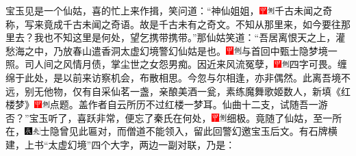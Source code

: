宝玉见是一个仙姑，喜的忙上来作揖，笑问道：``神仙姐姐，{\includegraphics[width=3mm]{../Images/00002}\includegraphics[width=3mm]{../Images/00011}\footnotesize \kaishu 千古未闻之奇称，写来竟成千古未闻之奇语。故是千古未有之奇文。}不知从那里来，如今要往那里去？我也不知这里是何处，望乞携带携带。''那仙姑笑道：``吾居离恨天之上，灌愁海之中，乃放春山遣香洞太虚幻境警幻仙姑是也。{\includegraphics[width=3mm]{../Images/00002}\includegraphics[width=3mm]{../Images/00011}\footnotesize \kaishu 与首回中甄士隐梦境一照。}司人间之风情月债，掌尘世之女怨男痴。因近来风流冤孽，{\includegraphics[width=3mm]{../Images/00002}\includegraphics[width=3mm]{../Images/00011}\footnotesize \kaishu 四字可畏。}缠绵于此处，是以前来访察机会，布散相思。今忽与尔相逢，亦非偶然。此离吾境不远，别无他物，仅有自采仙茗一盏，亲酿美酒一瓮，素练魔舞歌姬数人，新填《红楼梦》{\includegraphics[width=3mm]{../Images/00002}\includegraphics[width=3mm]{../Images/00011}\footnotesize \kaishu 点题。盖作者自云所历不过红楼一梦耳。}仙曲十二支，试随吾一游否？''宝玉听了，喜跃非常，便忘了秦氏在何处，{\includegraphics[width=3mm]{../Images/00002}\includegraphics[width=3mm]{../Images/00011}\footnotesize \kaishu 细极。}竟随了仙姑，至一所在，{\includegraphics[width=3mm]{../Images/00009}\includegraphics[width=3mm]{../Images/00012}\footnotesize \kaishu 士隐曾见此匾对，而僧道不能领入，留此回警幻邀宝玉后文。}有石牌横建，上书``太虚幻境''四个大字，两边一副对联，乃是：


